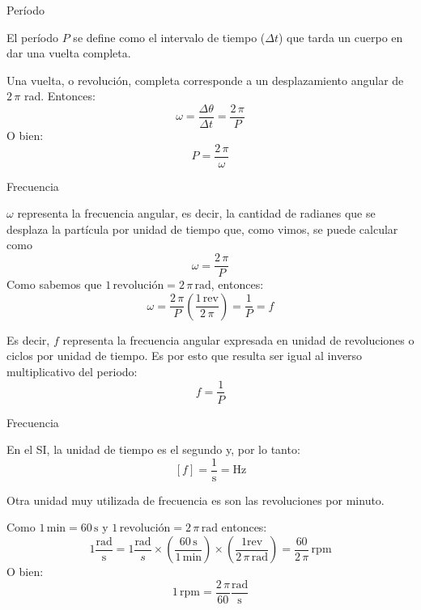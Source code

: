 \documentclass[11pt,handout,aspectratio=1610]{beamer}
\begin{document}
\begin{frame}{Período}

    El período $P$ se define como el intervalo de tiempo ($\Delta t$) que tarda un cuerpo en dar una vuelta completa. \pause 

    \vspace{11pt}

    Una vuelta, o revolución, completa corresponde a un desplazamiento angular de $2 \, \pi$ rad. Entonces: $$\omega = \frac{\Delta \theta}{\Delta  t} = \frac{2 \, \pi}{P}$$ O bien:    $$ P = \frac{2 \, \pi}{\omega}$$

\end{frame}

\begin{frame}{Frecuencia}

    $\omega$ representa la frecuencia angular, es decir, la cantidad de radianes que se desplaza la partícula por unidad de tiempo que, como vimos, se puede calcular como $$\omega = \frac{2 \, \pi}{P}$$ Como sabemos que $1 \, \text{revolución} = 2 \, \pi \, \text{rad}$, entonces: $$\omega = \frac{2 \, \pi}{P} \left(\frac{1 \, \text{rev}}{2 \, \pi}\right) = \frac{1}{P} = f$$

    Es decir, $f$ representa la frecuencia angular expresada en unidad de revoluciones o ciclos por unidad de tiempo. Es por esto que resulta ser igual al inverso multiplicativo del periodo: $$f  = \frac{1}{P}$$

\end{frame}

\begin{frame}{Frecuencia}

    En el SI, la unidad de tiempo es el segundo y, por lo tanto: $$\left[f\right] = \frac{1}{\text{s}} = \text{Hz}$$

    Otra unidad muy utilizada de frecuencia es son las revoluciones por minuto. \pause

    \vspace{11pt}

    Como $1 \, \text{min} = 60 \, \text{s}$ y $1 \, \text{revolución} = 2 \, \pi \, \text{rad}$ entonces: $$1 \frac{\text{rad}}{\text{s}} = 1 \frac{\text{rad}}{s} \times \left(\frac{60 \, \text{s}}{1 \, \text{min}}\right) \times \left(\frac{1 \text{rev}}{2 \, \pi \, \text{rad}}\right) = \frac{60}{2 \, \pi} \, \text{rpm}$$ O bien: $$ 1 \, \text{rpm} = \frac{2 \, \pi}{60} \frac{\text{rad}}{\text{s}}$$

\end{frame}
\end{document}
